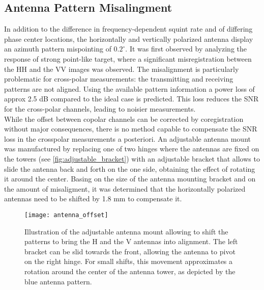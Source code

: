 \subsection{Antenna Pattern Misalingment}\label{sec:methods:misalingment}
In addition to the difference in frequency-dependent squint rate and of differing phase center locations, the horizontally and vertically polarized antenna display an azimuth pattern mispointing of $0.2^\circ$. It was first observed by analyzing the response of strong point-like target, where a significant misregistration between the HH and the VV images was observed. The misalignment is particularly problematic for cross-polar measurements: the transmitting and receiving patterns are not aligned. Using the available pattern information a power loss of approx 2.5 dB  compared to the ideal case is predicted. This loss reduces the SNR for the cross-polar channels, leading to noisier measurements.\\ While the offset between copolar channels can be corrected by coregistration without major consequences, there is no method capable to compensate the SNR loss in the crosspolar measurements a posteriori. An adjustable antenna mount was manufactured by replacing one of two hinges where the antennas are fixed on the towers (see \autoref{fig:adjustable_bracket}) with an adjustable bracket that allows to slide the antenna back and forth on the one side, obtaining the effect of rotating it around the center. Basing on the size of the antenna mounting bracket and on the amount of misaligment, it was determined that the horizontally polarized antennas need to be shifted by 1.8 mm to compensate it.
\begin{figure}[ht]
	\centering
	\texttt{[image: antenna\_offset]}
	\caption{Illustration of the adjustable antenna mount allowing to shift the patterns to bring the H and the V antennas into alignment. The left bracket can be slid towards the front, allowing the antenna to pivot on the right hinge. For small shifts, this movement approximates a rotation around the center of the antenna tower, as depicted by the blue antenna pattern.}
	\label{fig:adjustable_bracket}
\end{figure}
